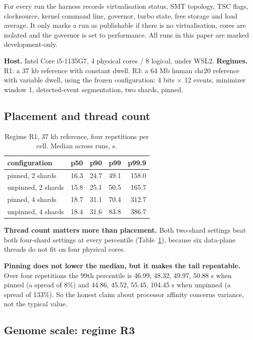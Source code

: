 \documentclass[conference]{IEEEtran}
\begin{document}
For every run the harness records virtualisation status, SMT topology, TSC flags,
clocksource, kernel command line, governor, turbo state, free storage and load average. It only
marks a run as publishable if there is no virtualisation, cores are isolated and the governor is
set to performance. All runs in this paper are marked development-only.

\textbf{Host.} Intel Core i5-1135G7, 4 physical cores / 8 logical, under WSL2.
\textbf{Regimes.} R1: a 37 kb reference with constant dwell. R3: a 64 Mb human chr20 reference
with variable dwell, using the frozen configuration: 4 bits $\times$ 12 events,
minimizer~\cite{minimizers} window 1, detected-event segmentation, two shards, pinned.

\subsection{Placement and thread count}

\begin{table}[t]
\caption{Regime R1, 37 kb reference, four repetitions per cell. Median across runs, \textmu{}s.}
\label{tab:r1}
\centering
\footnotesize
\begin{tabular}{lrrrr}
\toprule
configuration & p50 & p90 & p99 & p99.9 \\
\midrule
pinned, 2 shards   & 16.3 & 24.7 & 49.1 & 158.0 \\
unpinned, 2 shards & 15.8 & 25.1 & 50.5 & 165.7 \\
pinned, 4 shards   & 18.7 & 31.1 & 70.4 & 312.7 \\
unpinned, 4 shards & 18.4 & 31.6 & 83.8 & 386.7 \\
\bottomrule
\end{tabular}
\end{table}

\textbf{Thread count matters more than placement.} Both two-shard settings beat both four-shard
settings at every percentile (Table~\ref{tab:r1}), because six data-plane threads do not fit on
four physical cores.

\textbf{Pinning does not lower the median, but it makes the tail repeatable.} Over four
repetitions the 99th percentile is 46.99, 48.32, 49.97, 50.88 \textmu{}s when pinned (a spread of
8\%) and 44.86, 45.52, 55.45, 104.45 \textmu{}s when unpinned (a spread of 133\%). So the honest
claim about processor affinity concerns variance, not the typical value.

\subsection{Genome scale: regime R3}
\end{document}
